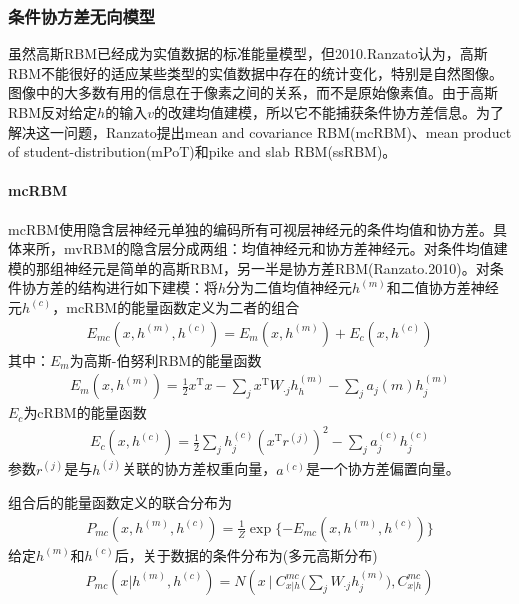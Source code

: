     \subsubsection{条件协方差无向模型}
        \par
        虽然高斯RBM已经成为实值数据的标准能量模型，但2010.Ranzato认为，高斯RBM不能很好的适应某些类型的实值数据中存在的统计变化，特别是自然图像。图像中的大多数有用的信息在于像素之间的关系，而不是原始像素值。由于高斯RBM反对给定$h$的输入$v$的改建均值建模，所以它不能捕获条件协方差信息。为了解决这一问题，Ranzato提出mean and covariance RBM(mcRBM)、mean product of student-distribution(mPoT)和pike and slab RBM(ssRBM)。
        \paragraph{mcRBM} mcRBM使用隐含层神经元单独的编码所有可视层神经元的条件均值和协方差。具体来所，mvRBM的隐含层分成两组：均值神经元和协方差神经元。对条件均值建模的那组神经元是简单的高斯RBM，另一半是协方差RBM(Ranzato.2010)。对条件协方差的结构进行如下建模：将$h$分为二值均值神经元$h^{(m)}$和二值协方差神经元$h^{(c)}$，mcRBM的能量函数定义为二者的组合
        \begin{align*}
        E_{mc}(x,h^{(m)},h^{(c)}) = E_m(x,h^{(m)}) +　E_c(x,h^{(c)})
        \end{align*}
        其中：$E_m$为高斯-伯努利RBM的能量函数
        \begin{align*}
        E_m(x,h^{(m)})  = \frac{1}{2} x^\mathrm{T}x - \sum_j x^\mathrm{T}W_{\cdot j}h_h^{(m)} - \sum_ja_j{(m)}h_j^{(m)}
        \end{align*}
        $E_c$为cRBM的能量函数
        \begin{align*}
        E_c(x,h^{(c)})  = \frac{1}{2} \sum_j h_j^{(c)} \left( x^\mathrm{T}r ^{(j)} \right) ^2 - \sum_ja_j^{(c)} h_j^{(c)}
        \end{align*}
        参数$r^{(j)}$是与$h^{(j)}$关联的协方差权重向量，$a^{(c)}$是一个协方差偏置向量。
        \par
        组合后的能量函数定义的联合分布为
        \begin{align*}
        P_{mc}(x,h^{(m)},h^{(c)}) = \frac{1}{Z}\exp\{-E_{mc}(x,h^{(m)},h^{(c)})\}
        \end{align*}
        给定$h^{(m)}$和$h^{(c)}$后，关于数据的条件分布为(多元高斯分布)
        \begin{align*}
        P_{mc}(x|h^{(m)},h^{(c)})  = N \left( x\ \Big| \ C_{x|h}^{mc} \Big( \sum_jW_{\cdot j}h_j^{(m)} \Big),C_{x|h}^{mc}   \right)
        \end{align*}
